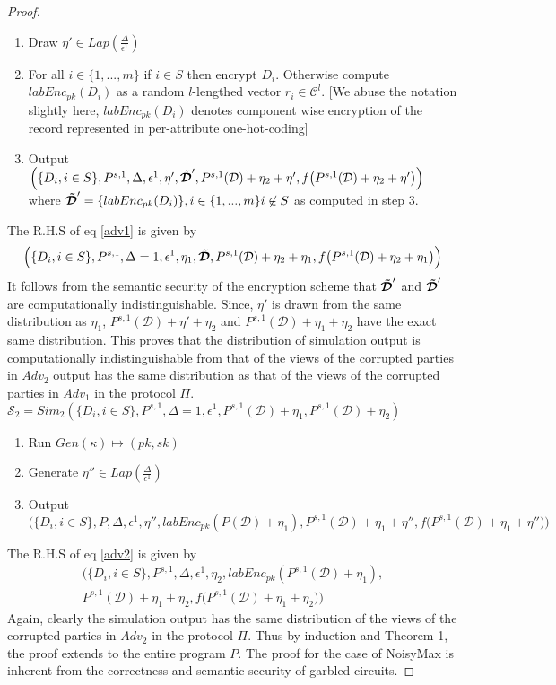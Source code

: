 \begin{proof}
\begin{enumerate}
\item Draw $\eta' \in Lap(\frac{\Delta}{\epsilon^1})$
\item For all $i \in \{1,...,m\}$ if $i \in S$ then encrypt $D_i$. 
Otherwise compute $labEnc_{pk}(D_i)$ as a random $l$-lengthed vector $r_i \in \mathcal{C}^l$. [We abuse the notation slightly here, $labEnc_{pk}(D_i)$ denotes component wise encryption of the record represented in per-attribute one-hot-coding]
\item Output $\Big(\{D_i, i \in S\},P^{s,1},\Delta,\epsilon^1,\eta',\boldsymbol{\tilde{\mathcal{D}}}',P^{s,1}(\mathcal{D})+\eta_2+\eta',f\big(P^{s,1}(\mathcal{D})+\eta_2+\eta'\big)\Big)$ where $\boldsymbol{\tilde{\mathcal{D}}}'=\{labEnc_{pk}(D_i)\},i \in \{1,...,m\} i \not \in S$ as computed in step 3.
\end{enumerate}
The R.H.S of eq \ref{adv1}  is given by 
\begin{gather}\Big(\{D_i, i \in S\},P^{s,1},\Delta=1,\epsilon^1, \eta_1,\boldsymbol{\tilde{\mathcal{D}}},P^{s,1}(\mathcal{D})+\eta_2+\eta_1,f\big(P^{s,1}(\mathcal{D})+\eta_2+\eta_1\big)\Big)\end{gather}
It follows from the semantic security of the encryption scheme that $\boldsymbol{\tilde{\mathcal{D}}}'$ and $\boldsymbol{\tilde{\mathcal{D}}}'$ are computationally indistinguishable.
Since, $\eta'$ is drawn from the same distribution as $\eta_1$, $P^{s,1}(\mathcal{D})+\eta'+\eta_2$ and $P^{s,1}(\mathcal{D})+\eta_1+\eta_2$ have the exact same distribution. This proves that the distribution of simulation output is computationally indistinguishable from that of the views of the corrupted parties in $Adv_2$
output has the same distribution as that of the views of the corrupted parties in $Adv_1$ in the
protocol $\Pi$.\\
$\mathcal{S}_2=Sim_2(\{D_i, i \in S\},P^{s,1},\Delta=1,\epsilon^1,P^{s,1}(\mathcal{D})+\eta_1,P^{s,1}(\mathcal{D})+\eta_2)$
\begin{enumerate}\item Run $Gen(\kappa)\mapsto (pk,sk)$ \item Generate $\eta'' \in Lap(\frac{\Delta}{\epsilon^1})$ \item Output $\Big(\{D_i, i \in S\},P,\Delta,\epsilon^1, \eta'', labEnc_{pk}(P(\mathcal{D})+\eta_1), P^{s,1}(\mathcal{D})+\eta_1+\eta'',f\big(P^{s,1}(\mathcal{D})+\eta_1+\eta''\big)\Big)$
\end{enumerate}
The R.H.S of eq \ref{adv2} is given by \begin{gather}\Big(\{D_i, i \in S\},P^{s,1},\Delta,\epsilon^1,\eta_2,labEnc_{pk}(P^{s,1}(\mathcal{D})+\eta_1),\\P^{s,1}(\mathcal{D})+\eta_1+\eta_2,f\big(P^{s,1}(\mathcal{D})+\eta_1+\eta_2\big)\Big)\end{gather}
Again, clearly the simulation output has the same distribution of the
views of the corrupted parties in $Adv_2$ in the protocol $\Pi$. 
Thus by induction and Theorem 1,  the proof extends to the entire program $P$.
The proof for the case of NoisyMax is inherent from the correctness and semantic security of garbled circuits.
\end{proof}
